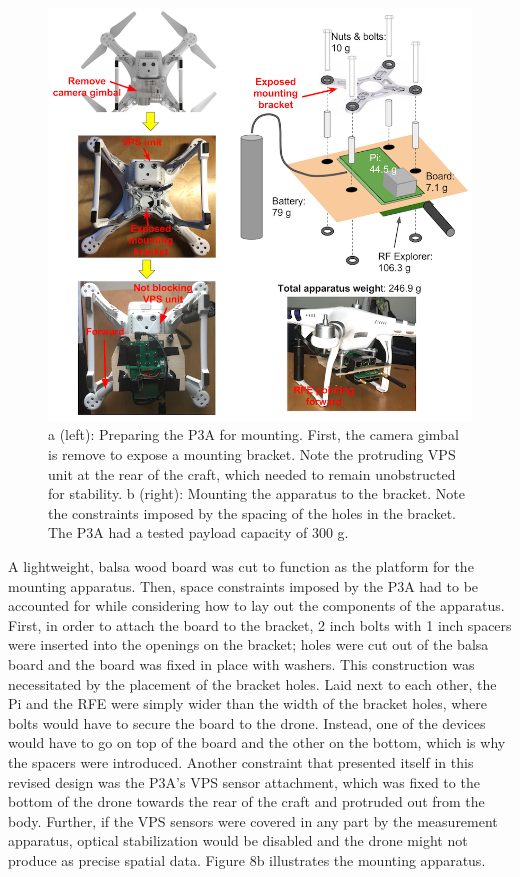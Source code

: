 \documentclass[pageno]{jpaper}
\begin{document}
\begin{figure}
	\caption[Preparing the drone and mounting the apparatus]{a (left): Preparing the P3A for mounting. First, the camera gimbal is remove to expose a mounting bracket. Note the protruding VPS unit at the rear of the craft, which needed to remain unobstructed for stability. b (right): Mounting the apparatus to the bracket. Note the constraints imposed by the spacing of the holes in the bracket. The P3A had a tested payload capacity of 300 g.}
	\centerline{\includegraphics{mounting}}
\end{figure}

 
 A lightweight, balsa wood board was cut to function as the platform for the mounting apparatus. Then, space constraints imposed by the P3A had to be accounted for while considering how to lay out the components of the apparatus. First, in order to attach the board to the bracket, 2 inch bolts with 1 inch spacers were inserted into the openings on the bracket; holes were cut out of the balsa board and the board was fixed in place with washers. This construction was necessitated by the placement of the bracket holes. Laid next to each other, the Pi and the RFE were simply wider than the width of the bracket holes, where bolts would have to secure the board to the drone. Instead, one of the devices would have to go on top of the board and the other on the bottom, which is why the spacers were introduced. Another constraint that presented itself in this revised design was the P3A's VPS sensor attachment, which was fixed to the bottom of the drone towards the rear of the craft and protruded out from the body. Further, if the VPS sensors were covered in any part by the measurement apparatus, optical stabilization would be disabled and the drone might not produce as precise spatial data.  Figure 8b illustrates the mounting apparatus.
 
\end{document}
